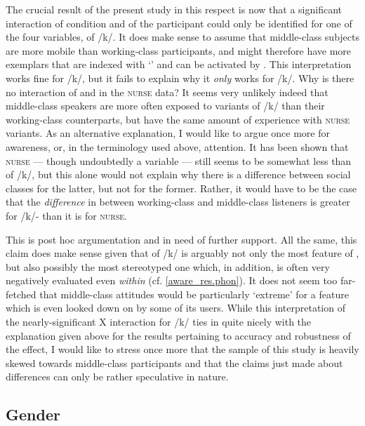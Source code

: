 The crucial result of the present study in this respect is now that a significant interaction of  condition and  of the participant could only be identified for one of the four variables,  of /k/.
It does make sense to assume that middle-class subjects are more mobile than working-class participants, and might therefore have more exemplars that are indexed with `' and can be activated by .
This interpretation works fine for /k/, but it fails to explain why it \emph{only} works for /k/.
Why is there no interaction of  and  in the \textsc{nurse} data?
It seems very unlikely indeed that middle-class speakers are more often exposed to  variants of /k/ than their working-class counterparts, but have the same amount of experience with  \textsc{nurse} variants.
As an alternative explanation, I would like to argue once more for awareness, or, in the terminology used above, attention.
It has been shown that \textsc{nurse} --- though undoubtedly a  variable --- still seems to be somewhat less  than  of /k/, but this alone would not explain why there is a difference between social classes for the latter, but not for the former.
Rather, it would have to be the case that the \emph{difference} in  between working-class and middle-class listeners is greater for /k/- than it is for \textsc{nurse}.

This is post hoc argumentation and in need of further support.
All the same, this claim does make sense given that  of /k/ is arguably not only the most  feature of , but also possibly the most stereotyped one which, in addition, is often very negatively evaluated even \emph{within}  (cf. \ref{aware_res.phon}).
It does not seem too far-fetched that middle-class attitudes would be particularly `extreme' for a feature which is even looked down on by some of its users.
While this interpretation of the nearly-significant  X  interaction for /k/ ties in quite nicely with the explanation given above for the results pertaining to accuracy and robustness of the  effect, I would like to stress once more that the sample of this study is heavily skewed towards middle-class participants and that the claims just made about  differences can only be rather speculative in nature.

		\subsection{Gender}

